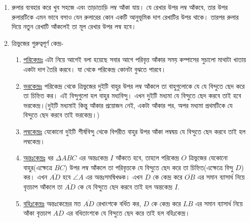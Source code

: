 \documentclass[a4paper,11pt]{article}
\begin{document}
\begin{enumerate}
\begin{center}
	      \end{center}
	\item রুলার ব্যবহার করে খুব সহজে এবং তাড়াতাড়ি লম্ব আঁকা যায়। যে রেখার উপর লম্ব আঁকবে, তার উপর রুলারটিকে এমন ভাবে বসাও যেন রুলারের কোন একটি আনুভূমিক দাগ রেখাটির উপর থাকে। তারপর রুলার দিয়ে নতুন রেখাটি আঁকলেই তা মূল রেখার উপর লম্ব হবে।
	\item ত্রিভুজের গুরুত্বপূর্ণ কেন্দ্র-
	      \begin{enumerate}[label=\roman*.]
		      \item \underline{পরিকেন্দ্রঃ} এটা নিয়ে আগেই বলা হয়েছে সবার আগে পরিবৃত্ত আঁকার সময় কম্পাসের সুচালো মাথাটা খাতায় একটা দাগ তৈরি করবে। যা থেকে পরিকেন্দ্র কোনটা বুঝতে পারবে।
		      \item \underline{ভরকেন্দ্রঃ} পরিকেন্দ্র থেকে ত্রিভুজের দুইটি বাহুর উপর লম্ব আঁকলে তা বাহুগুলোকে যে যে বিন্দুতে ছেদ করে তা চিহ্নিত কর। এই বিন্দুগুলো হল বাহুর মধ্যবিন্দু। এখন দুইটি মধ্যমা যে বিন্দুতে ছেদ করবে তাই হবে ভরকেন্দ্র।(দুইটি মধ্যমাই কিন্তু আঁকার প্রয়োজন নেই, একটা আঁকার পর, অপর মধ্যমা প্রথমটিকে যে বিন্দুতে ছেদ করবে তাই ভরকেন্দ্র।)
		      \item \underline{লম্বকেন্দ্রঃ} যেকোনো দুইটি শীর্ষবিন্দু থেকে বিপরীত বাহুর উপর আঁকা লম্বদ্বয় যে বিন্দুতে ছেদ করবে তাই হল লম্বকেন্দ্র।
		      \item \underline{অন্তঃকেন্দ্রঃ} ধর $\Delta ABC$ এর অন্তঃকেন্দ্র $I$ আঁকতে হবে, তাহলে পরিকেন্দ্র $O$ ত্রিভুজের যেকোনো বাহুর(এক্ষেত্রে $\overline{BC}$) উপর লম্ব আঁকলে তা পরিবৃত্তকে যে বিন্দুতে ছেদ করে তা চিহ্নিত(এক্ষেত্রে বিন্দু $D$) কর। এখন $\overline{AD}$ হবে $\angle A$ এর অন্তঃসমদ্বিখণ্ডক। এখন $D$ কে কেন্দ্র করে $\overline{OB}$ এর সমান ব্যাসার্ধ নিয়ে বৃত্তচাপ আঁকলে তা $\overline{AD}$ কে যে বিন্দুতে ছেদ করবে তাই হল অন্তকেন্দ্র $I$.
		      \item \underline{বহিঃকেন্দ্রঃ} অন্তঃকেন্দ্রের মত $\overline{AD}$ রেখাংশকে বর্ধিত কর, $D$ কে কেন্দ্র করে $LB$ এর সমান ব্যাসার্ধ নিয়ে আঁকা বৃত্তচাপ $AD$ এর বধিতাংশকে যে বিন্দুতে ছেদ করে তাই হল বহিঃকেন্দ্র।
		            \begin{figure}[ht]
			            \begin{minipage}{0.5\linewidth}
				            \centering 
				            \begin{tikzpicture}[scale=0.75]

\end{tikzpicture}
\end{minipage}
\end{figure}
\end{enumerate}
\end{enumerate}
\end{document}
